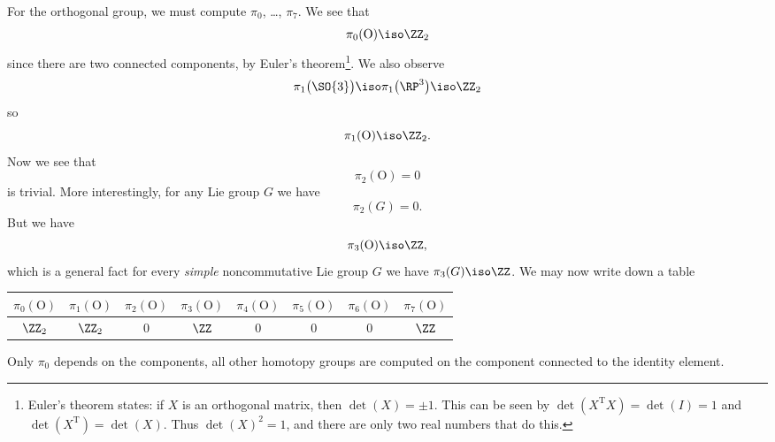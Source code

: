 For the orthogonal group, we must compute $\pi_{0}$, \dots,
$\pi_{7}$. We see that
\begin{equation}
\pi_{0}(\mathrm{O})\iso\ZZ_2
\end{equation}
since there are two connected components, by Euler's
theorem\footnote{Euler's theorem states: if $X$ is an orthogonal
matrix, then $\det(X)=\pm1$. This can be seen by
$\det(X^{\mathrm{T}}X)=\det(I)=1$ and
$\det(X^{\mathrm{T}})=\det(X)$. Thus $\det(X)^2=1$, and there are
only two real numbers that do this.}. We also observe
\begin{equation}
\pi_{1}\bigl(\SO{3}\bigr)\iso\pi_{1}\bigl(\RP^3\bigr)\iso\ZZ_2
\end{equation}
so
\begin{equation}
\pi_{1}(\mathrm{O})\iso\ZZ_2.
\end{equation}
Now we see that
\begin{equation}
\pi_{2}(\mathrm{O})=0
\end{equation}
is trivial. More interestingly, for any Lie group $G$ we have
\begin{equation}
\pi_{2}(G)=0.
\end{equation}
But we have
\begin{equation}
\pi_{3}(\mathrm{O})\iso\ZZ,
\end{equation}
which is a general fact for every \emph{simple} noncommutative
Lie group $G$ we have $\pi_{3}(G)\iso\ZZ$.
We may now write down a table
\begin{center}
\begin{tabular}{c|c|c|c|c|c|c|c}
$\pi_{0}(\mathrm{O})$ & 
$\pi_{1}(\mathrm{O})$ & 
$\pi_{2}(\mathrm{O})$ & 
$\pi_{3}(\mathrm{O})$ & 
$\pi_{4}(\mathrm{O})$ & 
$\pi_{5}(\mathrm{O})$ & 
$\pi_{6}(\mathrm{O})$ & 
$\pi_{7}(\mathrm{O})$\\ \hline
$\ZZ_2$ & $\ZZ_2$ & 0 & $\ZZ$ & 0 & 0 & 0 & $\ZZ$
\end{tabular}
\end{center}
Only $\pi_{0}$ depends on the components, all other homotopy
groups are computed on the component connected to the identity
element. 


